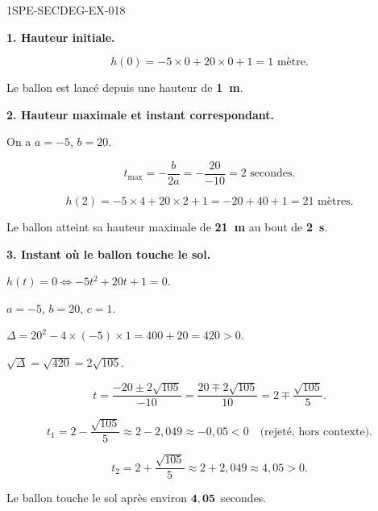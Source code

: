 \begin{corrige}{1SPE-SECDEG-EX-018}

\textbf{1. Hauteur initiale.}


\[h(0) = -5 \times 0 + 20 \times 0 + 1 = 1 \text{ mètre}.\]

Le ballon est lancé depuis une hauteur de \textbf{1~m}.

\medskip
\textbf{2. Hauteur maximale et instant correspondant.}


On a $a = -5$, $b = 20$.

\[t_{\max} = -\frac{b}{2a} = -\frac{20}{-10} = 2 \text{ secondes}.\]

\[h(2) = -5 \times 4 + 20 \times 2 + 1 = -20 + 40 + 1 = 21 \text{ mètres}.\]

Le ballon atteint sa hauteur maximale de \textbf{21~m} au bout de \textbf{2~s}.

\medskip
\textbf{3. Instant où le ballon touche le sol.}


$h(t) = 0 \iff -5t^2 + 20t + 1 = 0$.

$a = -5$, $b = 20$, $c = 1$.

$\Delta = 20^2 - 4 \times (-5) \times 1 = 400 + 20 = 420 > 0$.

$\sqrt{\Delta} = \sqrt{420} = 2\sqrt{105}$.

\[t = \frac{-20 \pm 2\sqrt{105}}{-10} = \frac{20 \mp 2\sqrt{105}}{10} = 2 \mp \frac{\sqrt{105}}{5}.\]

\[t_1 = 2 - \frac{\sqrt{105}}{5} \approx 2 - 2{,}049 \approx -0{,}05 < 0 \quad \text{(rejeté, hors contexte).}\]

\[t_2 = 2 + \frac{\sqrt{105}}{5} \approx 2 + 2{,}049 \approx 4{,}05 > 0.\]

Le ballon touche le sol après environ $\mathbf{4{,}05}$~secondes.

\end{corrige}
